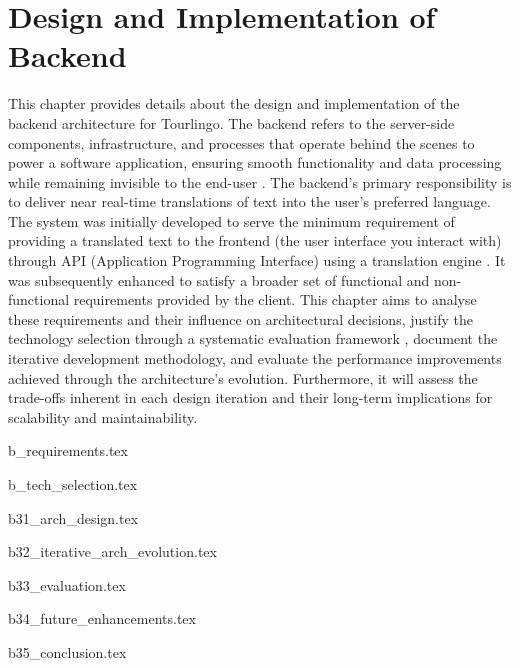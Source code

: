 \chapter{Design and Implementation of Backend}\label{sec:backend}

This chapter provides details about the design and implementation of the backend architecture for Tourlingo. The backend refers to the server-side components, infrastructure, and processes that operate behind the scenes to power a software application, ensuring smooth functionality and data processing while remaining invisible to the end-user \cite{Backend-def}. The backend's primary responsibility is to deliver near real-time translations of text into the user's preferred language. The system was initially developed to serve the minimum requirement of providing a translated text to the frontend (the user interface you interact with) through API (Application Programming Interface) \cite{what-is-an-api} using a translation engine \cite{machine-translation,libretranslate}. It was subsequently enhanced to satisfy a broader set of functional and non-functional requirements provided by the client. This chapter aims to analyse these requirements and their influence on architectural decisions\cite{parmar2011architectural}, justify the technology selection through a systematic evaluation framework \cite{decision-matrix-software-development,mcda}, document the iterative development methodology, and evaluate the performance improvements achieved through the architecture's evolution. Furthermore, it will assess the trade-offs inherent in each design iteration and their long-term implications for scalability and maintainability. 

{b_requirements.tex}

{b_tech_selection.tex}

{b31_arch_design.tex}

{b32_iterative_arch_evolution.tex}

{b33_evaluation.tex}

{b34_future_enhancements.tex}

{b35_conclusion.tex}

